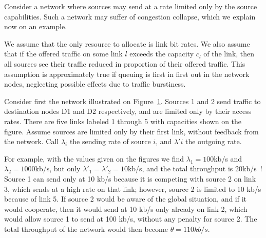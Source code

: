 
Consider a network where sources may send at a rate limited
only by the source capabilities. Such a network may suffer of
congestion collapse, which we explain now on an example.

We assume that the only resource to allocate is link bit
rates. We also assume that if the offered traffic on some link
$l$ exceeds the capacity $c_{l}$ of the link, then all sources
see their traffic reduced in proportion of their offered
traffic. This assumption is approximately true if queuing is
first in first out in the network nodes, neglecting possible
effects due to traffic burstiness.

Consider first the network illustrated on Figure~\ref{D31-f1}.
Sources 1 and 2 send traffic to destination nodes D1 and D2
respectively, and are limited only by their access rates.
There are five links labeled 1 through 5 with capacities shown
on the figure. Assume sources are limited only by their first
link, without feedback from the network. Call $\lambda_i$ the
sending rate of source $i$, and $\lambda'i$ the outgoing rate.

For example, with the values given on the figures we find
$\lambda_1=100$kb/s and $\lambda_2=1000$kb/s, but only
$\lambda'_1=\lambda'_2=10$kb/s, and the total throughput is
$20$kb/s~! Source 1 can send only at 10 kb/s because it is
competing with source 2 on link 3, which sends at a high rate
on that link; however, source 2 is limited to 10 kb/s because
of link 5. If source 2 would be aware of the global situation,
and if it would cooperate, then it would send at 10 kb/s only
already on link 2, which would allow source 1 to send at 100
kb/s, without any penalty for source 2. The total throughput
of the network would then become $\theta = 110 kb/s$.

\begin{figure}[htbp]
        \protect\label{D31-f1}
\end{figure}

